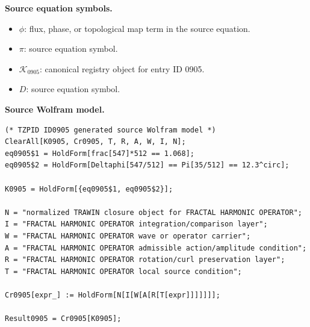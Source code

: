 \begin{minipage}[t]{0.49\linewidth}
\begingroup
\small
\raggedright
\textbf{Source equation symbols.}\par
\begin{itemize}[leftmargin=1.35em,itemsep=1pt,topsep=1pt,parsep=0pt]
    \item $\phi$: flux, phase, or topological map term in the source equation.
    \item $\pi$: source equation symbol.
    \item $\mathcal{K}_{0905}$: canonical registry object for entry ID 0905.
    \item $D$: source equation symbol.
\end{itemize}
\endgroup
\end{minipage}\hfill
\begin{minipage}[t]{0.47\linewidth}
\begingroup
\scriptsize
\raggedright
\textbf{Source Wolfram model.}\par
\begin{Verbatim}[fontsize=\tiny,breaklines=true,breakanywhere=true]
(* TZPID ID0905 generated source Wolfram model *)
ClearAll[K0905, Cr0905, T, R, A, W, I, N];
eq0905$1 = HoldForm[frac[547]*512 == 1.068];
eq0905$2 = HoldForm[Deltaphi[547/512] == Pi[35/512] == 12.3^circ];

K0905 = HoldForm[{eq0905$1, eq0905$2}];

N = "normalized TRAWIN closure object for FRACTAL HARMONIC OPERATOR";
I = "FRACTAL HARMONIC OPERATOR integration/comparison layer";
W = "FRACTAL HARMONIC OPERATOR wave or operator carrier";
A = "FRACTAL HARMONIC OPERATOR admissible action/amplitude condition";
R = "FRACTAL HARMONIC OPERATOR rotation/curl preservation layer";
T = "FRACTAL HARMONIC OPERATOR local source condition";

Cr0905[expr_] := HoldForm[N[I[W[A[R[T[expr]]]]]]];

Result0905 = Cr0905[K0905];
\end{Verbatim}
\endgroup
\end{minipage}

